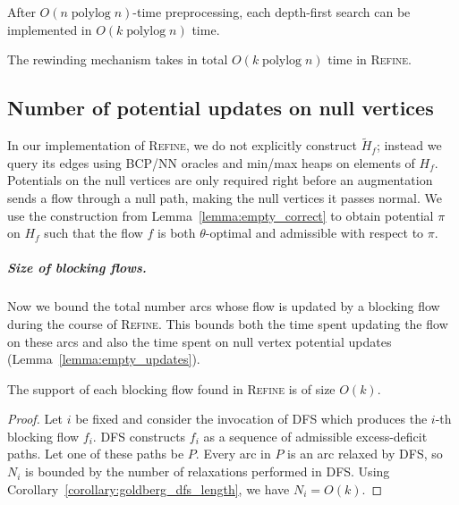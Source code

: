 \documentclass[a4paper,UKenglish]{socg-lipics-v2018}
\makeatletter
\def\polylog{\mathop{\mathrm{polylog}}}
\theoremstyle{plain}
\numberwithin{figure}{section}
\renewcommand{\paragraph}{\subparagraph}
\def\n@te#1{\textsf{\boldmath \textbf{$\langle\!\langle$#1$\rangle\!\rangle$}}\leavevmode}
\def\note#1{\textcolor{red}{\n@te{#1}}}
\makeatother
\begin{document}
\begin{toappendix}
\begin{lemmarep}
\label{lemma:goldberg_dfs_time}
After $O(n \polylog n)$-time preprocessing,
each depth-first search can be implemented in $O(k \polylog n)$ time.
\end{lemmarep}

\begin{lemmarep}
The rewinding mechanism takes in total $O(k\polylog n)$ time in \textsc{Refine}.
\end{lemmarep}


\subsection{Number of potential updates on null vertices}
\label{SSA:null-potential-update}

In our implementation of \textsc{Refine}, we do not explicitly construct $\tilde{H}_f$; instead we query its edges using BCP/NN
oracles and min/max heaps on elements of $H_f$.
Potentials on the null vertices are only required right before an augmentation sends a flow through a
null path, making the null vertices it passes normal.
We use the construction from Lemma~\ref{lemma:empty_correct}
to obtain potential $\pi$ on $H_f$ such that the flow $f$ is both $\theta$-optimal and admissible with respect to $\pi$.

\paragraph{Size of blocking flows.}

Now we bound the total number arcs whose flow is updated by a blocking flow during the course of \textsc{Refine}.
This bounds both the time spent updating the flow on these arcs and also the time spent on null vertex potential updates
(Lemma~\ref{lemma:empty_updates}).

\begin{lemmarep}
\label{lemma:goldberg_bf_size}
The support of each blocking flow %
found in \textsc{Refine} is of size $O(k)$.
\end{lemmarep}

\begin{proof}
Let $i$ be fixed and consider the invocation of \textsc{DFS} which produces the
$i$-th blocking flow $f_i$.
\textsc{DFS} constructs $f_i$ as a sequence of admissible excess-deficit paths.
Let one of these paths be $P$.
Every arc in $P$ is an arc relaxed by \textsc{DFS}, so $N_i$ is bounded by the
number of relaxations performed in \textsc{DFS}.
Using Corollary~\ref{corollary:goldberg_dfs_length}, we have $N_i = O(k)$.
\end{proof}



\end{toappendix}
\end{document}
